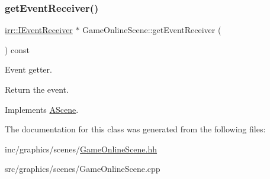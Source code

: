 \subsubsection{\texorpdfstring{get\+Event\+Receiver()}{getEventReceiver()}}
{\footnotesize\ttfamily \hyperlink{classirr_1_1IEventReceiver}{irr\+::\+I\+Event\+Receiver} $\ast$ Game\+Online\+Scene\+::get\+Event\+Receiver (\begin{DoxyParamCaption}{ }\end{DoxyParamCaption}) const\hspace{0.3cm}{\ttfamily [virtual]}}



Event getter. 

Return the event. 

Implements \hyperlink{classAScene_af521e5e6d30a5d2e5d30eb333e4d3abd}{A\+Scene}.



The documentation for this class was generated from the following files\+:\begin{DoxyCompactItemize}
\item 
inc/graphics/scenes/\hyperlink{GameOnlineScene_8hh}{Game\+Online\+Scene.\+hh}\item 
src/graphics/scenes/Game\+Online\+Scene.\+cpp\end{DoxyCompactItemize}
